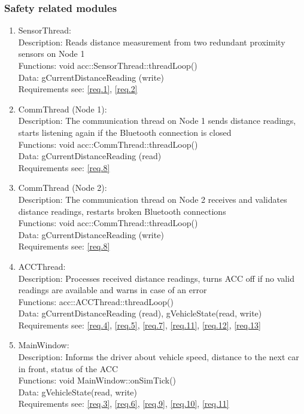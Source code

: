 \subsubsection{Safety related modules}
\begin{enumerate}
	\item SensorThread: \\
		Description: Reads distance measurement from two redundant proximity sensors on Node 1\\
		Functions: void acc::SensorThread::threadLoop()\\
		Data: gCurrentDistanceReading (write)\\
		Requirements see: \ref{req.1}, \ref{req.2} \\
	\item CommThread (Node 1): \\
		Description: The communication thread on Node 1 sends distance readings, starts listening again if the Bluetooth connection is closed \\
		Functions: void acc::CommThread::threadLoop()\\
		Data: gCurrentDistanceReading (read)\\
		Requirements see: \ref{req.8} \\
	\item CommThread (Node 2): \\
		Description: The communication thread on Node 2 receives and validates distance readings, restarts broken Bluetooth connections \\
		Functions: void acc::CommThread::threadLoop()\\
		Data: gCurrentDistanceReading (write)\\
		Requirements see: \ref{req.8} \\
	\item ACCThread: \\
		Description: Processes received distance readings, turns ACC off if no valid readings are available and warns in case of an error \\
		Functions: acc::ACCThread::threadLoop()\\
		Data: gCurrentDistanceReading (read), gVehicleState(read, write)\\
		Requirements see: \ref{req.4}, \ref{req.5}, \ref{req.7}, \ref{req.11}, \ref{req.12}, \ref{req.13} \\
	\item MainWindow: \\
		Description: Informs the driver about vehicle speed, distance to the next car in front, status of the ACC \\
		Functions: void MainWindow::onSimTick()\\
		Data: gVehicleState(read, write) \\
		Requirements see: \ref{req.3}, \ref{req.6}, \ref{req.9}, \ref{req.10}, \ref{req.11} \\
\end{enumerate}

